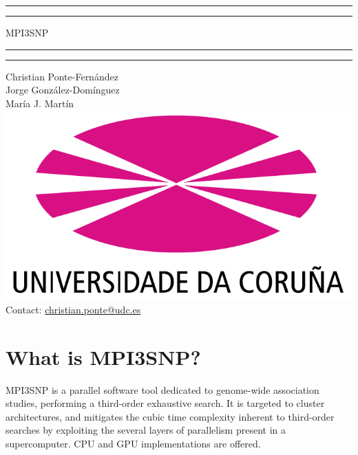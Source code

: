 \documentclass[12pt,hidelinks]{article}
\begin{document}
\begin{titlepage}
    \centering %
    \scshape %
    \vspace*{1.5\baselineskip} %
    \rule{13cm}{1.6pt}\vspace*{-\baselineskip}\vspace*{2pt} %
    \rule{13cm}{0.4pt} %
    
    \vspace{0.75\baselineskip} %
    {    \Huge MPI3SNP \\    }
    \vspace{0.75\baselineskip} %
    \rule{13cm}{0.4pt}\vspace*{-\baselineskip}\vspace{3.2pt} %
    \rule{13cm}{1.6pt} %
    
    \vspace{1.75\baselineskip} %
    {\large 
        Christian Ponte-Fernández \\ \vspace{1mm}
        Jorge González-Domínguez \\ \vspace{2.5mm}
        María J. Martín
    } \\
    \vfill
    \includegraphics[width=.35\textwidth]{logo} \\
    \vspace{1mm}
    Contact: \url{christian.ponte@udc.es}\\ 
\end{titlepage}
\clearpage
\thispagestyle{empty}
\mbox{}
\clearpage
\setcounter{page}{1}
\tableofcontents
\newpage
{}
\section{What is MPI3SNP?}
    MPI3SNP is a parallel software tool dedicated to genome-wide association 
    studies, performing a third-order exhaustive search. It is targeted to 
    cluster architectures, and mitigates the cubic time complexity inherent to 
    third-order searches by exploiting the several layers of parallelism 
    present in a supercomputer. CPU and GPU implementations are offered.
\end{document}
